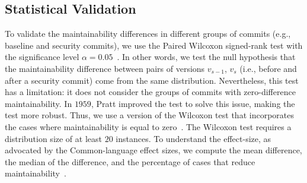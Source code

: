 \documentclass[smallextended]{svjour3}       %
\begin{document}
%
%
%
%

\subsection{Statistical Validation}\label{sec:statsval}
%
To validate the maintainability differences in different groups of 
commits (e.g., baseline and security commits), we use the Paired 
Wilcoxon signed-rank test with the significance level $\alpha = 
0.05$~\cite{10.2307/3001968}. In other words, we test the null 
hypothesis that the maintainability difference between pairs of 
versions $v_{s-1}$, $v_s$ (i.e., before and after a security commit) 
come from the same distribution. Nevertheless, this test has a 
limitation: it does not consider the groups of commits with 
zero-difference maintainability. In $1959$, Pratt improved the 
test to solve this issue, making the test more robust. Thus, 
we use a version of the Wilcoxon test that 
incorporates the cases where maintainability is equal to 
zero~\cite{10.2307/2282543}. The Wilcoxon test requires a 
distribution size of at least $20$ instances. To understand the 
effect-size, as advocated by the Common-language effect 
sizes, we compute the mean difference, the median of 
the difference, and the percentage of cases that reduce 
maintainability~\cite{graw:1992}.
%
\end{document}
